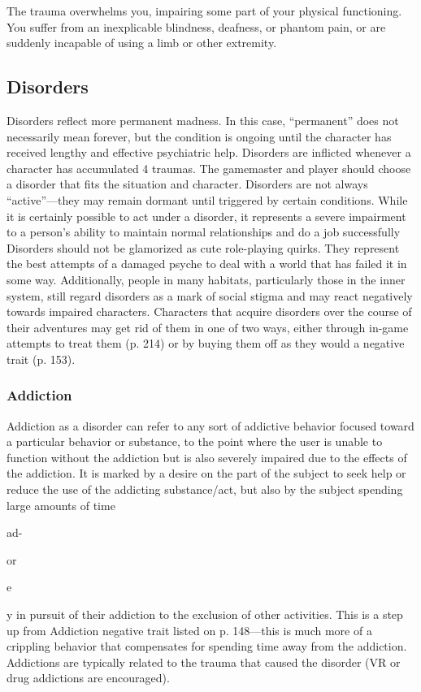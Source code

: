 The trauma overwhelms you, impairing some part of 
your physical functioning. You suffer from an inexplicable
blindness, deafness, or phantom pain, or are suddenly
incapable of using a limb or other extremity.

\subsection{Disorders}

Disorders reflect more permanent madness. In this 
case, ``permanent'' does not necessarily mean forever, 
but the condition is ongoing until the character has received
lengthy and effective psychiatric help. Disorders
are inflicted whenever a character has accumulated 4 
traumas. The gamemaster and player should choose a 
disorder that fits the situation and character.
Disorders are not always ``active''—they may 
remain dormant until triggered by certain conditions. 
While it is certainly possible to act under a disorder, 
it represents a severe impairment to a person's ability 
to maintain normal relationships and do a job successfully
Disorders should not be glamorized as cute
role-playing quirks. They represent the best attempts 
of a damaged psyche to deal with a world that has 
failed it in some way. Additionally, people in many 
habitats, particularly those in the inner system, still 
regard disorders as a mark of social stigma and may 
react negatively towards impaired characters.
Characters that acquire disorders over the course 
of their adventures may get rid of them in one of two 
ways, either through in-game attempts to treat them 
(p. 214) or by buying them off as they would a negative
trait (p. 153).

\subsubsection{Addiction}

Addiction as a disorder can refer to any sort of addictive
behavior focused toward a particular behavior
or substance, to the point where the user is unable 
to function without the addiction but is also severely 
impaired due to the effects of the addiction. It is 
marked by a desire on the part of the subject to seek 
help or reduce the use of the addicting substance/act, 
but also by the subject spending large amounts of time 

ad-

or

e

y
in pursuit of their addiction to the exclusion of other 
activities. This is a step up from Addiction negative 
trait listed on p. 148—this is much more of a crippling 
behavior that compensates for spending time away 
from the addiction. Addictions are typically related 
to the trauma that caused the disorder (VR or drug 
addictions are encouraged).

